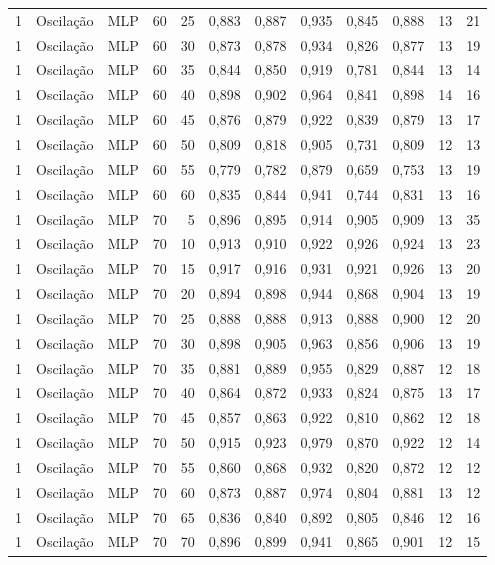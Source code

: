 \begin{longtable}{@{}rllrrrrrrrrr@{}}
1 & Oscilação & MLP & 60 & 25 & 0,883 & 0,887 & 0,935 & 0,845 & 0,888 & 13 & 21 \\
1 & Oscilação & MLP & 60 & 30 & 0,873 & 0,878 & 0,934 & 0,826 & 0,877 & 13 & 19 \\
1 & Oscilação & MLP & 60 & 35 & 0,844 & 0,850 & 0,919 & 0,781 & 0,844 & 13 & 14 \\
1 & Oscilação & MLP & 60 & 40 & 0,898 & 0,902 & 0,964 & 0,841 & 0,898 & 14 & 16 \\
1 & Oscilação & MLP & 60 & 45 & 0,876 & 0,879 & 0,922 & 0,839 & 0,879 & 13 & 17 \\
1 & Oscilação & MLP & 60 & 50 & 0,809 & 0,818 & 0,905 & 0,731 & 0,809 & 12 & 13 \\
1 & Oscilação & MLP & 60 & 55 & 0,779 & 0,782 & 0,879 & 0,659 & 0,753 & 13 & 19 \\
1 & Oscilação & MLP & 60 & 60 & 0,835 & 0,844 & 0,941 & 0,744 & 0,831 & 13 & 16 \\
1 & Oscilação & MLP & 70 & 5 & 0,896 & 0,895 & 0,914 & 0,905 & 0,909 & 13 & 35 \\
1 & Oscilação & MLP & 70 & 10 & 0,913 & 0,910 & 0,922 & 0,926 & 0,924 & 13 & 23 \\
1 & Oscilação & MLP & 70 & 15 & 0,917 & 0,916 & 0,931 & 0,921 & 0,926 & 13 & 20 \\
1 & Oscilação & MLP & 70 & 20 & 0,894 & 0,898 & 0,944 & 0,868 & 0,904 & 13 & 19 \\
1 & Oscilação & MLP & 70 & 25 & 0,888 & 0,888 & 0,913 & 0,888 & 0,900 & 12 & 20 \\
1 & Oscilação & MLP & 70 & 30 & 0,898 & 0,905 & 0,963 & 0,856 & 0,906 & 13 & 19 \\
1 & Oscilação & MLP & 70 & 35 & 0,881 & 0,889 & 0,955 & 0,829 & 0,887 & 12 & 18 \\
1 & Oscilação & MLP & 70 & 40 & 0,864 & 0,872 & 0,933 & 0,824 & 0,875 & 13 & 17 \\
1 & Oscilação & MLP & 70 & 45 & 0,857 & 0,863 & 0,922 & 0,810 & 0,862 & 12 & 18 \\
1 & Oscilação & MLP & 70 & 50 & 0,915 & 0,923 & 0,979 & 0,870 & 0,922 & 12 & 14 \\
1 & Oscilação & MLP & 70 & 55 & 0,860 & 0,868 & 0,932 & 0,820 & 0,872 & 12 & 12 \\
1 & Oscilação & MLP & 70 & 60 & 0,873 & 0,887 & 0,974 & 0,804 & 0,881 & 13 & 12 \\
1 & Oscilação & MLP & 70 & 65 & 0,836 & 0,840 & 0,892 & 0,805 & 0,846 & 12 & 16 \\
1 & Oscilação & MLP & 70 & 70 & 0,896 & 0,899 & 0,941 & 0,865 & 0,901 & 12 & 15 \\

\end{longtable}
